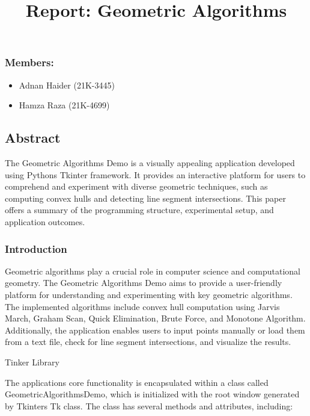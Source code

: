 \documentclass[
]{article}
\title{Report: Geometric Algorithms}
\author{}
\date{}
\begin{document}
\maketitle

\subsubsection{Members:}\label{members}

\begin{itemize}
\item
  Adnan Haider (21K-3445)
\item
  Hamza Raza (21K-4699)
\end{itemize}

\subsection{Abstract}\label{abstract}

The Geometric Algorithms Demo is a visually appealing application
developed using Python\textquotesingle s Tkinter framework. It provides
an interactive platform for users to comprehend and experiment with
diverse geometric techniques, such as computing convex hulls and
detecting line segment intersections. This paper offers a summary of the
programming structure, experimental setup, and application outcomes.

\subsubsection{Introduction}\label{introduction}

Geometric algorithms play a crucial role in computer science and
computational geometry. The Geometric Algorithms Demo aims to provide a
user-friendly platform for understanding and experimenting with key
geometric algorithms. The implemented algorithms include convex hull
computation using Jarvis March, Graham Scan, Quick Elimination, Brute
Force, and Monotone Algorithm. Additionally, the
application enables users to input points manually or load them from a
text file, check for line segment intersections, and visualize the
results.

Tinker Library

The application\textquotesingle s core functionality is encapsulated
within a class called GeometricAlgorithmsDemo, which is initialized with
the root window generated by Tkinter\textquotesingle s Tk class. The
class has several methods and attributes, including:
\end{document}
